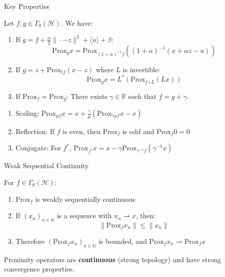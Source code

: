 \documentclass[aspectratio=169,10pt]{beamer}
\begin{document}
\begin{frame}[allowframebreaks]{Key Properties}
\begin{property}
Let $f, g \in \Gamma_0(\mathcal{H})$. We have:
\begin{enumerate}
    \item If $g = f + \frac{\alpha}{2}\|\cdot - z\|^2 + \langle u \rangle + \beta$:
    \[
    \mathrm{Prox}_g x = \mathrm{Prox}_{(1+\alpha)^{-1}f}\left((1+\alpha)^{-1}(x + \alpha z - u)\right)
    \]
    \item If $g = z + \mathrm{Prox}_{tf}(x - z)$ where $L$ is invertible:
    \[
    \mathrm{Prox}_g x = L^*(\mathrm{Prox}_{f \circ L}(Lx))
    \]
    \item If $\mathrm{Prox}_f = \mathrm{Prox}_g$: There exists $\gamma \in \mathbb{R}$ such that $f = g + \gamma$.
\end{enumerate}
\end{property}

\framebreak

\begin{property}
\begin{enumerate}
    \item Scaling: $\mathrm{Prox}_{\mu f} x = x + \frac{\gamma}{\mu}(\mathrm{Prox}_{\gamma\mu f} x - x)$
    \item Reflection: If $f$ is even, then $\mathrm{Prox}_f$ is odd and $\mathrm{Prox}_f 0 = 0$
    \item Conjugate: For $f^*$, $\mathrm{Prox}_{f^*} x = x - \gamma \mathrm{Prox}_{\gamma^{-1}f}(\gamma^{-1}x)$
\end{enumerate}
\end{property}
\end{frame}

\begin{frame}{Weak Sequential Continuity}
\begin{theorem}
For $f \in \Gamma_0(\mathcal{H})$:
\begin{enumerate}
    \item $\mathrm{Prox}_f$ is weakly sequentially continuous
    \item If $(x_n)_{n \in \mathbb{N}}$ is a sequence with $x_n \rightharpoonup x$, then:
    \[
    \|\mathrm{Prox}_f x_n\| \leq \|x_n\|
    \]
    \item Therefore $(\mathrm{Prox}_f x_n)_{n \in \mathbb{N}}$ is bounded, and $\mathrm{Prox}_f x_n \rightharpoonup \mathrm{Prox}_f x$
\end{enumerate}
\end{theorem}

\vspace{0.3cm}

\begin{corollary}
Proximity operators are \textbf{continuous} (strong topology) and have strong convergence properties.
\end{corollary}
\end{frame}
\end{document}
